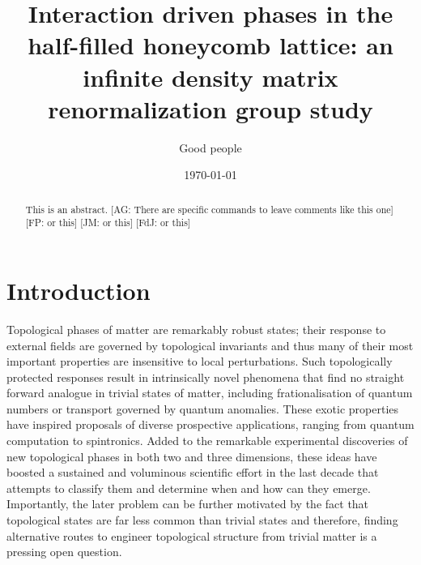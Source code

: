 \documentclass[aps,prx,10pt,twocolumn,floatfix,superscriptaddress,showpacs,numerical,footinbib]{revtex4-1}
\newcommand{\noteAG}[1]{{\color{blue} [AG: #1]}}
\newcommand{\noteFP}[1]{{\color{magenta} [FP: #1]}}
\newcommand{\noteJM}[1]{{\color{red} [JM: #1]}}
\newcommand{\noteFdJ}[1]{{\color{cyan} [FdJ: #1]}}
\begin{document}
%
\title{Interaction driven phases in the half-filled honeycomb lattice: an infinite density matrix renormalization group study}
%
\author{Good people}
%
\date{\today}
%
\begin{abstract}
%
This is an abstract.
%
\noteAG{There are specific commands to leave comments like this one}\noteFP{or this}\noteJM{or this}\noteFdJ{or this}
%
\end{abstract}
%
\maketitle
%

\section{Introduction}
%
Topological phases of matter are remarkably robust states; their response to external fields are
governed by topological invariants and thus many of their most important properties are insensitive to local perturbations.
%
Such topologically protected responses result in intrinsically novel phenomena that find no straight forward analogue in trivial states
of matter, including frationalisation of quantum numbers or transport governed by quantum anomalies.
%
These exotic properties have inspired proposals of diverse prospective applications, ranging from quantum computation to spintronics.
%
Added to the remarkable experimental discoveries of new topological phases in both two and three dimensions,
these ideas have boosted a sustained and voluminous scientific effort in the last decade that attempts to classify them and determine when and how can they emerge.
%
Importantly, the later problem can be further motivated by the fact that topological states are far less common than trivial states
and therefore, finding alternative routes to engineer topological structure from trivial matter is a pressing open question.\\
%
\end{document}
